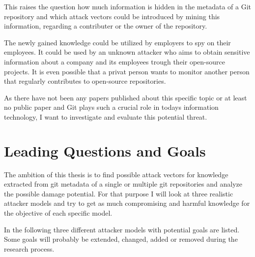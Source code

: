 \documentclass{thesis}
\begin{document}
This raises the question how much information is hidden in the metadata of a Git repository and which attack vectors could be introduced by mining this information, regarding a contributer or the owner of the repository.

The newly gained knowledge could be utilized by employers to spy on their employees.
It could be used by an unknown attacker who aims to obtain sensitive information about a company and its employees trough their open-source projects.
It is even possible that a privat person wants to monitor another person that regularly contributes to open-source repositories.


As there have not been any papers published about this specific topic or at least no public paper and Git plays such a crucial role in todays information technology, I want to investigate and evaluate this potential threat.


\section{Leading Questions and Goals}

The ambition of this thesis is to find possible attack vectors for knowledge extracted from git metadata of a single or multiple git repositories and analyze the possible damage potential.
For that purpose I will look at three realistic attacker models and try to get as much compromising and harmful knowledge for the objective of each specific model.

In the following three different attacker models with potential goals are listed.
Some goals will probably be extended, changed, added or removed during the research process.
\end{document}
